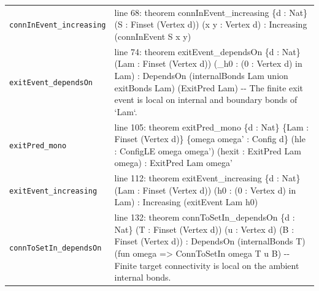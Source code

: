 \documentclass[10pt]{article}
\begin{document}
\begin{longtable}{>{\raggedright\arraybackslash}p{} >{\raggedright\arraybackslash}p{}}
\texttt{connInEvent\_\allowbreak{}increasing} & {\ttfamily\scriptsize line 68:\allowbreak{} theorem connInEvent\_\allowbreak{}increasing \{d :\allowbreak{} Nat\} (\allowbreak{}S :\allowbreak{} Finset (\allowbreak{}Vertex d)\allowbreak{})\allowbreak{} (\allowbreak{}x y :\allowbreak{} Vertex d)\allowbreak{} :\allowbreak{} Increasing (\allowbreak{}connInEvent S x y)\allowbreak{}} \\[0.45em]
\texttt{exitEvent\_\allowbreak{}dependsOn} & {\ttfamily\scriptsize line 74:\allowbreak{} theorem exitEvent\_\allowbreak{}dependsOn \{d :\allowbreak{} Nat\} (\allowbreak{}Lam :\allowbreak{} Finset (\allowbreak{}Vertex d)\allowbreak{})\allowbreak{} (\allowbreak{}\_\allowbreak{}h0 :\allowbreak{} (\allowbreak{}0 :\allowbreak{} Vertex d)\allowbreak{} in Lam)\allowbreak{} :\allowbreak{} DependsOn (\allowbreak{}internalBonds Lam union exitBonds Lam)\allowbreak{} (\allowbreak{}ExitPred Lam)\allowbreak{} -\allowbreak{}-\allowbreak{} The finite exit event is local on internal and boundary bonds of `Lam`.\allowbreak{}} \\[0.45em]
\texttt{exitPred\_\allowbreak{}mono} & {\ttfamily\scriptsize line 105:\allowbreak{} theorem exitPred\_\allowbreak{}mono \{d :\allowbreak{} Nat\} \{Lam :\allowbreak{} Finset (\allowbreak{}Vertex d)\allowbreak{}\} \{omega omega' :\allowbreak{} Config d\} (\allowbreak{}hle :\allowbreak{} ConfigLE omega omega')\allowbreak{} (\allowbreak{}hexit :\allowbreak{} ExitPred Lam omega)\allowbreak{} :\allowbreak{} ExitPred Lam omega'} \\[0.45em]
\texttt{exitEvent\_\allowbreak{}increasing} & {\ttfamily\scriptsize line 112:\allowbreak{} theorem exitEvent\_\allowbreak{}increasing \{d :\allowbreak{} Nat\} (\allowbreak{}Lam :\allowbreak{} Finset (\allowbreak{}Vertex d)\allowbreak{})\allowbreak{} (\allowbreak{}h0 :\allowbreak{} (\allowbreak{}0 :\allowbreak{} Vertex d)\allowbreak{} in Lam)\allowbreak{} :\allowbreak{} Increasing (\allowbreak{}exitEvent Lam h0)\allowbreak{}} \\[0.45em]
\texttt{connToSetIn\_\allowbreak{}dependsOn} & {\ttfamily\scriptsize line 132:\allowbreak{} theorem connToSetIn\_\allowbreak{}dependsOn \{d :\allowbreak{} Nat\} (\allowbreak{}T :\allowbreak{} Finset (\allowbreak{}Vertex d)\allowbreak{})\allowbreak{} (\allowbreak{}u :\allowbreak{} Vertex d)\allowbreak{} (\allowbreak{}B :\allowbreak{} Finset (\allowbreak{}Vertex d)\allowbreak{})\allowbreak{} :\allowbreak{} DependsOn (\allowbreak{}internalBonds T)\allowbreak{} (\allowbreak{}fun omega =\allowbreak{}> ConnToSetIn omega T u B)\allowbreak{} -\allowbreak{}-\allowbreak{} Finite target connectivity is local on the ambient internal bonds.\allowbreak{}} \\[0.45em]

\end{longtable}
\end{document}
